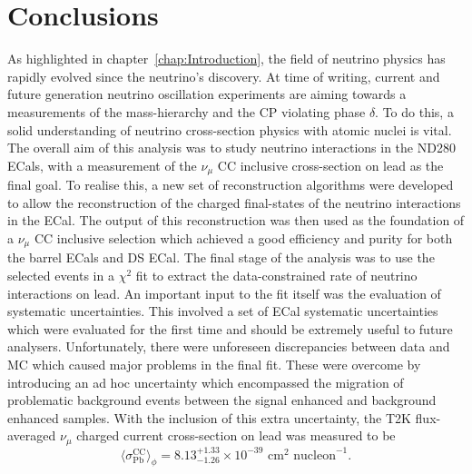 \section{Conclusions}
\label{sec:Conclusions}
As highlighted in chapter~\ref{chap:Introduction}, the field of neutrino physics has rapidly evolved since the neutrino's discovery.  At time of writing, current and future generation neutrino oscillation experiments are aiming towards a measurements of the mass-hierarchy and the CP violating phase $\delta$.  To do this, a solid understanding of neutrino cross-section physics with atomic nuclei is vital. 
\newline
\newline
The overall aim of this analysis was to study neutrino interactions in the ND280 ECals, with a measurement of the $\nu_\mu$ CC inclusive cross-section on lead as the final goal.  To realise this, a new set of reconstruction algorithms were developed to allow the reconstruction of the charged final-states of the neutrino interactions in the ECal.  The output of this reconstruction was then used as the foundation of a $\nu_\mu$ CC inclusive selection which achieved a good efficiency and purity for both the barrel ECals and DS ECal.  The final stage of the analysis was to use the selected events in a $\chi^2$ fit to extract the data-constrained rate of neutrino interactions on lead.  An important input to the fit itself was the evaluation of systematic uncertainties.  This involved a set of ECal systematic uncertainties which were evaluated for the first time and should be extremely useful to future analysers.
\newline
\newline
Unfortunately, there were unforeseen discrepancies between data and MC which caused major problems in the final fit.  These were overcome by introducing an ad hoc uncertainty which encompassed the migration of problematic background events between the signal enhanced and background enhanced samples.  With the inclusion of this extra uncertainty, the T2K flux-averaged $\nu_\mu$ charged current cross-section on lead was measured to be 
\begin{equation}
\langle \sigma^{\textrm{CC}}_{\textrm{Pb}} \rangle_{\phi} = 8.13^{+1.33}_{-1.26} \times 10^{-39} \textrm{ cm}^2 \textrm{ nucleon}^{-1}.
\end{equation}

